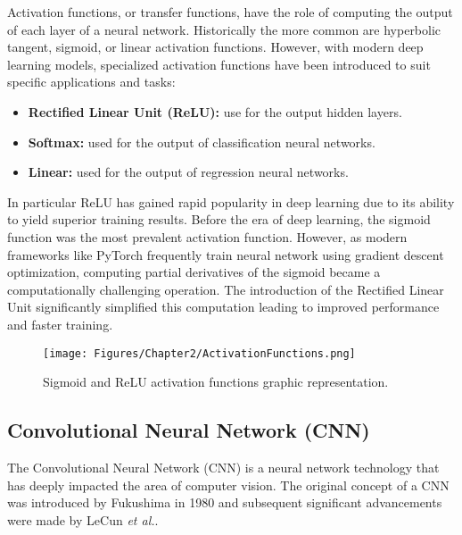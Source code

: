 Activation functions, or transfer functions, have the role of computing the output of each layer of a neural network. Historically the more common are hyperbolic tangent, sigmoid, or linear activation functions. However, with modern deep learning models, specialized activation functions have been introduced to suit specific applications and tasks:
\begin{itemize}
    \item\textbf{Rectified Linear Unit (ReLU):} use for the output hidden layers.
    \item\textbf{Softmax:} used for the output of classification neural networks.
    \item\textbf{Linear:} used for the output of regression neural networks.
\end{itemize}
In particular ReLU has gained rapid popularity in deep learning due to its ability to yield superior training results. Before the era of deep learning, the sigmoid function was the most prevalent activation function. However, as modern frameworks like PyTorch frequently train neural network using gradient descent optimization, computing partial derivatives of the sigmoid became a computationally challenging operation. The introduction of the Rectified Linear Unit significantly simplified this computation leading to improved performance and faster training.

\begin{figure}[th]
    \centering
    \texttt{[image: Figures/Chapter2/ActivationFunctions.png]}
    \caption[Sigmoid vs. ReLU]{Sigmoid and ReLU activation functions graphic representation.}
    \label{fig:ActivationFunctions}
\end{figure}


\subsection{Convolutional Neural Network (CNN)}
The Convolutional Neural Network (CNN) is a neural network technology that has deeply impacted the area of computer vision. The original concept of a CNN was introduced by Fukushima in 1980\parencite{fukushima} and subsequent significant advancements were made by LeCun \emph{et al.}\parencite{Lecun}.

